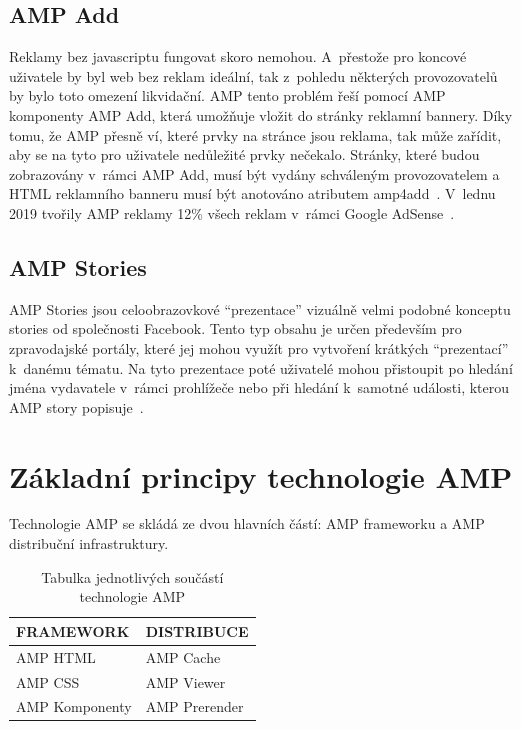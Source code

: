 \subsection*{AMP Add}
Reklamy bez javascriptu fungovat skoro nemohou. A~přestože pro koncové uživatele by byl web bez reklam ideální, tak z~pohledu některých provozovatelů by bylo toto omezení likvidační. AMP tento problém řeší pomocí AMP komponenty AMP Add, která umožňuje vložit do stránky reklamní bannery. Díky tomu, že AMP přesně ví, které prvky na stránce jsou reklama, tak může zařídit, aby se na tyto pro uživatele nedůležité prvky nečekalo. Stránky, které budou zobrazovány v~rámci AMP Add, musí být vydány schváleným provozovatelem a HTML reklamního banneru musí být anotováno atributem amp4add~\cite[Ch.\ 6, p.\ 280]{VzhuruDoAMP}.
V~lednu 2019 tvořily AMP reklamy 12\% všech reklam v~rámci Google AdSense~\cite{abner_2019}.
\subsection*{AMP Stories}
AMP Stories jsou celoobrazovkové “prezentace” vizuálně velmi podobné konceptu stories od společnosti Facebook. Tento typ obsahu je určen především pro zpravodajské portály, které jej mohou využít pro vytvoření krátkých
“prezentací” k~danému tématu. Na tyto prezentace poté uživatelé mohou přistoupit po hledání jména
vydavatele v~rámci prohlížeče nebo při hledání k~samotné události, kterou AMP story popisuje~\cite[Ch.\ 6, p.\ 290]{VzhuruDoAMP}.

\section{Základní principy technologie AMP}
Technologie AMP se skládá ze dvou hlavních částí: AMP frameworku a AMP distribuční infrastruktury. 

\begin{table}[H]
	\caption{Tabulka jednotlivých součástí technologie AMP} 
	\centering
	\begin{tabular}{m{15em} | m{15em}}
		\toprule
		\cmidrule(r){1-2}
		FRAMEWORK & DISTRIBUCE \\
		\midrule
		AMP HTML & AMP Cache \\
		AMP CSS & AMP Viewer \\
		AMP Komponenty & AMP Prerender \\
		\bottomrule
	\end{tabular}
	\label{tab:Součásti technologie AMP}
\end{table}

